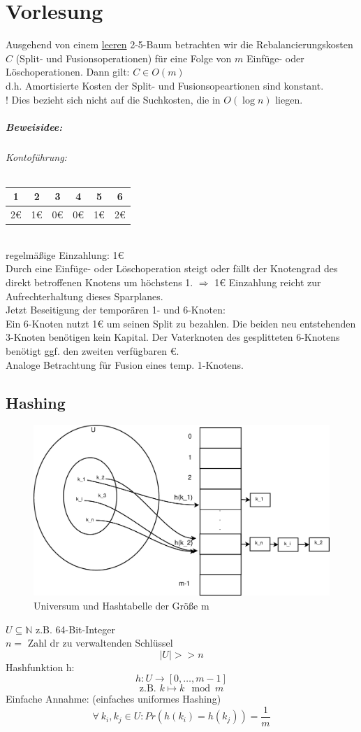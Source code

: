 \chapter{Vorlesung}
\satz Ausgehend von einem \underline{leeren} 2-5-Baum betrachten wir die Rebalancierungskosten $C$ (Split- und Fusionsoperationen) für eine Folge von $m$ Einfüge- oder Löschoperationen. Dann gilt: $C\in O(m)$\\
d.h. Amortisierte Kosten der Split- und Fusionsopeartionen sind konstant.\\
! Dies bezieht sich nicht auf die Suchkosten, die in $O(\log n)$ liegen.
\paragraph*{Beweisidee:}
\subparagraph*{Kontoführung:}
\begin{tabular}{|c|c|c|c|c|c|}
	\hline \rule[-2ex]{0pt}{5.5ex} 1 & 2 & 3 & 4 & 5 & 6 \\ 
	\hline \rule[-2ex]{0pt}{5.5ex} 2€ & 1€ & 0€ & 0€ & 1€ & 2€ \\ 
	\hline 
\end{tabular} \\
regelmäßige Einzahlung: 1€\\
Durch eine Einfüge- oder Löschoperation steigt oder fällt der Knotengrad des direkt betroffenen Knotens um höchstens 1. $\Rightarrow$ 1€ Einzahlung reicht zur Aufrechterhaltung dieses Sparplanes.\\
Jetzt Beseitigung der temporären 1- und 6-Knoten:\\
Ein 6-Knoten nutzt 1€ um seinen Split zu bezahlen. Die beiden neu entstehenden 3-Knoten benötigen kein Kapital. Der Vaterknoten des gesplitteten 6-Knotens benötigt ggf. den zweiten verfügbaren €.\\
Analoge Betrachtung für Fusion eines temp. 1-Knotens.
\section{Hashing}
\begin{figure}[h]
\centering
\caption[Universum und Hashtabelle der Größe m]{Universum und Hashtabelle der Größe m}
\label{fig:hashing}
\includegraphics[width=0.8\linewidth]{13/Grafik/hashing}
\end{figure}
$U \subseteq \mathbb{N}$ z.B. 64-Bit-Integer\\
$n=$ Zahl dr zu verwaltenden Schlüssel\\
\[|U| >> n\]
Hashfunktion h:
\[h: U\rightarrow[0,\ldots,m-1]\]
\[\text{z.B. }k\mapsto k \mod m \]
Einfache Annahme: (einfaches uniformes Hashing)
\[\forall~k_i,k_j \in U : Pr(h(k_i)=h(k_j))=\frac{1}{m}   \]
